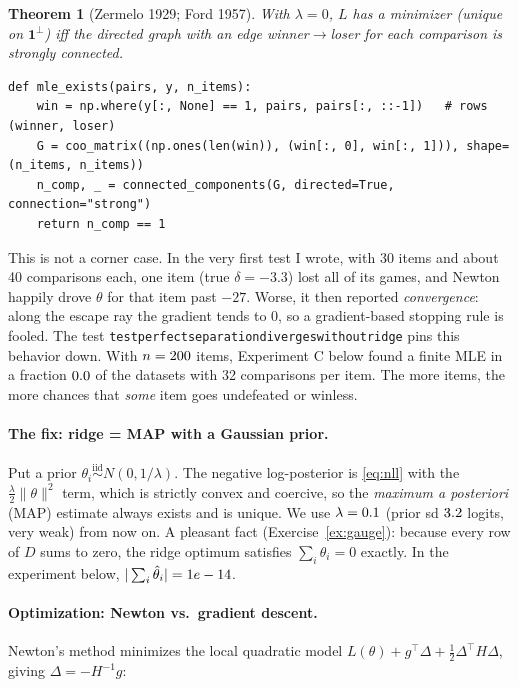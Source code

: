 \documentclass[11pt]{article}
\theoremstyle{definition}
\theoremstyle{plain}
\newtheorem{theorem}[definition]{Theorem}
\theoremstyle{remark}
\newcommand{\code}[1]{\texttt{#1}}
\renewcommand{\_}{\oldunderscore\allowbreak}
\newcommand{\file}[1]{\textcolor{blue!50!black}{\texttt{#1}}}
\newcommand{\codefrom}[1]{\par\smallskip\noindent{\footnotesize\textbf{From} \file{#1}}}
\begin{document}
\begin{theorem}[Zermelo 1929; Ford 1957]
With $\lambda=0$, $L$ has a minimizer (unique on $\mathbf 1^\perp$) iff the directed graph with an edge
winner$\to$loser for each comparison is strongly connected.
\end{theorem}

\codefrom{src/calcdiff/models/bt.py}
\begin{lstlisting}
def mle_exists(pairs, y, n_items):
    win = np.where(y[:, None] == 1, pairs, pairs[:, ::-1])   # rows (winner, loser)
    G = coo_matrix((np.ones(len(win)), (win[:, 0], win[:, 1])), shape=(n_items, n_items))
    n_comp, _ = connected_components(G, directed=True, connection="strong")
    return n_comp == 1
\end{lstlisting}
This is not a corner case. In the very first test I wrote, with 30 items and about 40 comparisons each, one item
(true $\delta=-3.3$) lost all of its games, and Newton happily drove $\theta$ for that item past $-27$. Worse, it then reported
\emph{convergence}: along the escape ray the gradient tends to 0, so a gradient-based stopping rule is fooled. The test
\code{test\_perfect\_separation\_diverges\_without\_ridge} pins this behavior down. With $n=200$ items, Experiment C
below found a finite MLE in a fraction $0.0$ of the datasets with 32 comparisons per item. The more items, the more chances
that \emph{some} item goes undefeated or winless.

\paragraph{The fix: ridge = MAP with a Gaussian prior.}
Put a prior $\theta_i\overset{\text{iid}}\sim N(0,1/\lambda)$. The negative log-posterior is \eqref{eq:nll} with the
$\frac\lambda2\|\theta\|^2$ term, which is strictly convex and coercive, so the \emph{maximum a posteriori} (MAP) estimate always exists
and is unique. We use $\lambda=0.1$ (prior sd $3.2$ logits, very weak) from now on. A pleasant fact (Exercise~\ref{ex:gauge}):
because every row of $D$ sums to zero, the ridge optimum satisfies $\sum_i\theta_i=0$ exactly. In the experiment
below, $|\sum_i\hat\theta_i|=1e-14$.

\paragraph{Optimization: Newton vs.\ gradient descent.}
Newton's method minimizes the local quadratic model $L(\theta)+g^\top\Delta+\frac12\Delta^\top H\Delta$, giving
$\Delta=-H^{-1}g$:
\end{document}
